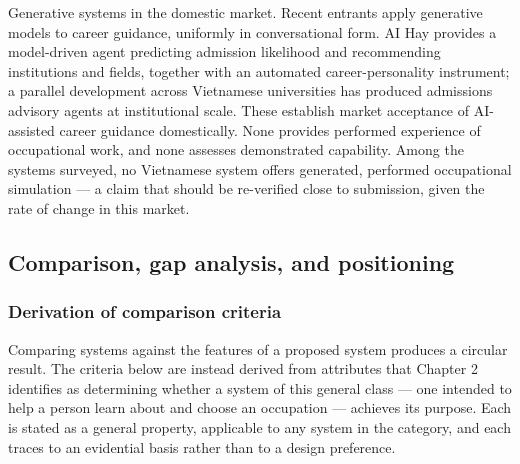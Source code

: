 Generative systems in the domestic market. Recent entrants apply generative models to career guidance, uniformly in conversational form. AI Hay\cite{r94} provides a model-\allowbreak{}driven agent predicting admission likelihood and recommending institutions and fields, together with an automated career-\allowbreak{}personality instrument; a parallel development across Vietnamese universities has produced admissions advisory agents at institutional scale. These establish market acceptance of AI-assisted career guidance domestically. None provides performed experience of occupational work, and none assesses demonstrated capability. Among the systems surveyed, no Vietnamese system offers generated, performed occupational simulation --- a claim that should be re-verified close to submission, given the rate of change in this market.

\subsection{Comparison, gap analysis, and positioning}

\subsubsection{Derivation of comparison criteria}

Comparing systems against the features of a proposed system produces a circular result. The criteria below are instead derived from attributes that Chapter 2 identifies as determining whether a system of this general class --- one intended to help a person learn about and choose an occupation --- achieves its purpose. Each is stated as a general property, applicable to any system in the category, and each traces to an evidential basis rather than to a design preference.

